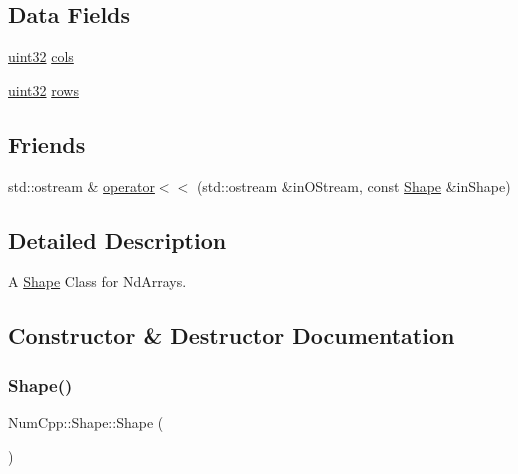 \subsection*{Data Fields}
\begin{DoxyCompactItemize}
\item 
\mbox{\hyperlink{namespace_num_cpp_a36f388e948380413c63011cab9b7fbd5}{uint32}} \mbox{\hyperlink{class_num_cpp_1_1_shape_af652ab5cc158f4ddff5f351b07886f6a}{cols}}
\item 
\mbox{\hyperlink{namespace_num_cpp_a36f388e948380413c63011cab9b7fbd5}{uint32}} \mbox{\hyperlink{class_num_cpp_1_1_shape_ac2bbb80a615e9a66121a89ec699973ad}{rows}}
\end{DoxyCompactItemize}
\subsection*{Friends}
\begin{DoxyCompactItemize}
\item 
std\+::ostream \& \mbox{\hyperlink{class_num_cpp_1_1_shape_a520d818f31bbdacdf8cfbe6de9e88a28}{operator$<$$<$}} (std\+::ostream \&in\+O\+Stream, const \mbox{\hyperlink{class_num_cpp_1_1_shape}{Shape}} \&in\+Shape)
\end{DoxyCompactItemize}


\subsection{Detailed Description}
A \mbox{\hyperlink{class_num_cpp_1_1_shape}{Shape}} Class for Nd\+Arrays. 

\subsection{Constructor \& Destructor Documentation}
\mbox{\label{class_num_cpp_1_1_shape_abb6de2ea6cd701a0dac5dabd07b6e0a6}} 
\subsubsection{\texorpdfstring{Shape()}{Shape()}\hspace{0.1cm}{\footnotesize\ttfamily [1/3]}}
{\footnotesize\ttfamily Num\+Cpp\+::\+Shape\+::\+Shape (\begin{DoxyParamCaption}{ }\end{DoxyParamCaption})\hspace{0.3cm}{\ttfamily [inline]}}

